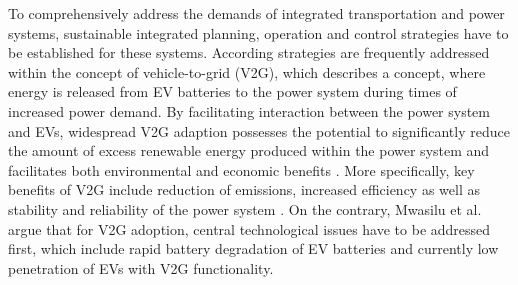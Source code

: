 To comprehensively address the demands of integrated transportation and power systems, sustainable integrated planning, operation and control strategies have to be established for these systems. According strategies are frequently addressed within the concept of vehicle-to-grid (V2G), which describes a concept, where energy is released from EV batteries to the power system during times of increased power demand. By facilitating interaction between the power system and EVs, widespread V2G adaption possesses the potential to significantly reduce the amount of excess renewable energy produced within the power system and facilitates both environmental and economic benefits \cite{richardson2013electric, faria2012sustainability, mwasilu2014electric}. More specifically, key benefits of V2G include reduction of emissions, increased efficiency as well as stability and reliability of the power system \cite{yilmaz2013review}.
On the contrary, Mwasilu et al.~\cite{mwasilu2014electric} argue that for V2G adoption, central technological issues 
have to be addressed first, which include rapid battery degradation of EV batteries and currently low penetration of EVs with V2G functionality.




%
